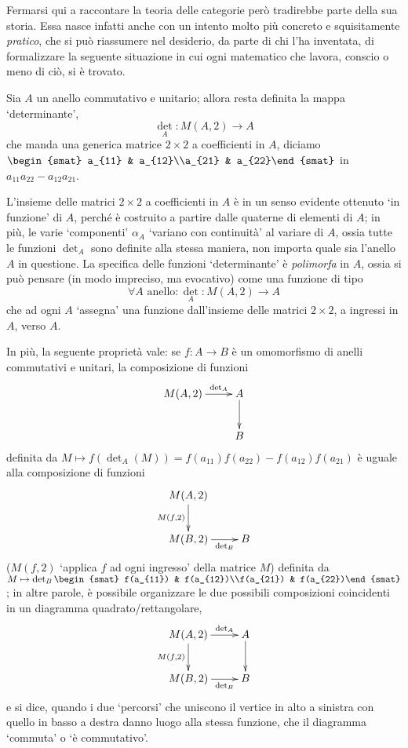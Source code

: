 Fermarsi qui a raccontare la teoria delle categorie però tradirebbe parte della sua storia. Essa nasce infatti anche con un intento molto più concreto e squisitamente \emph{pratico}, che si può riassumere nel desiderio, da parte di chi l'ha inventata, di formalizzare la seguente situazione in cui ogni matematico che lavora, conscio o meno di ciò, si è trovato.
\begin{example}
	Sia \(A\) un anello commutativo e unitario; allora resta definita la mappa `determinante',
	\[\textstyle\det_A : M(A,2) \to A\]
	che manda una generica matrice \(2\times 2\) a coefficienti in \(A\), diciamo \(\begin{smat} a_{11} & a_{12}\\a_{21} & a_{22}\end{smat}\) in \(a_{11}a_{22}-a_{12}a_{21}\).
\end{example}
L'insieme delle matrici \(2\times 2\) a coefficienti in \(A\) è in un senso evidente ottenuto `in funzione' di \(A\), perché è costruito a partire dalle quaterne di elementi di \(A\); in più, le varie `componenti' \(\alpha_A\) `variano con continuità' al variare di \(A\), ossia tutte le funzioni \(\det_A\) sono definite alla stessa maniera, non importa quale sia l'anello \(A\) in questione. La specifica delle funzioni `determinante' è \emph{polimorfa} in \(A\), ossia si può pensare (in modo impreciso, ma evocativo) come una funzione di tipo
\[\textstyle\forall A \text{ anello} : \det_A : M(A,2) \to A\]
che ad ogni \(A\) `assegna' una funzione dall'insieme delle matrici \(2\times 2\), a ingressi in \(A\), verso \(A\).

In più, la seguente proprietà vale: se \(f : A\to B\) è un omomorfismo di anelli commutativi e unitari, la composizione di funzioni
\[\xymatrix{
	M(A,2) \ar[r]^-{\det_A}& A\ar[d] \\
	& B
	}\]
definita da \(M\mapsto f(\det_A(M)) = f(a_{11})f(a_{22})-f(a_{12})f(a_{21})\) è uguale alla composizione di funzioni
\[\xymatrix{
	M(A,2) \ar[d]_{M(f,2)}&  \\
	M(B,2) \ar[r]_-{\det_B} & B
	}\] (\(M(f,2)\) `applica \(f\) ad ogni ingresso' della matrice \(M\)) definita da \(M\mapsto \det_B \begin{smat} f(a_{11}) & f(a_{12})\\f(a_{21}) & f(a_{22})\end{smat}\); in altre parole, è possibile organizzare le due possibili composizioni coincidenti in un diagramma quadrato/rettangolare,
\[\xymatrix{
	M(A,2) \ar[d]_{M(f,2)}\ar[r]^-{\det_A}& A\ar[d] \\
	M(B,2) \ar[r]_-{\det_B} & B
	}\]
e si dice, quando i due `percorsi' che uniscono il vertice in alto a sinistra con quello in basso a destra danno luogo alla stessa funzione, che il diagramma `commuta' o `è commutativo'.

